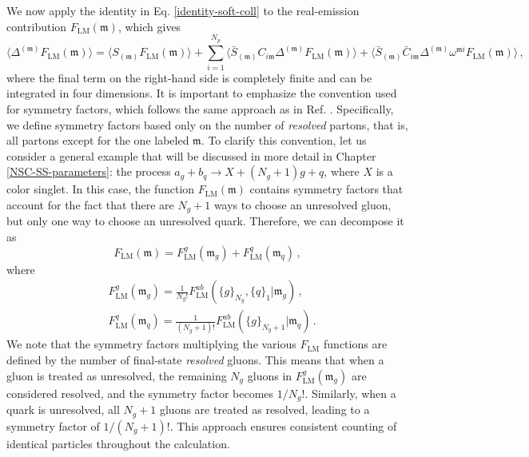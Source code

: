 \documentclass[a4paper, 12pt]{book}
\newcommand{\um}{\mathfrak{m}}
\begin{document}
We now apply the identity in Eq. \ref{identity-soft-coll} to the real-emission contribution $F_{\mathrm{LM}}(\um)$, which gives
\begin{equation}
  \langle \Delta^{(\um)}F_{\mathrm{LM}}(\um) \rangle = \langle S_{(\um)}F_{\mathrm{LM}}(\um) \rangle + \sum_{i=1}^{N_p} \langle \bar{S}_{(\um)}C_{i\um} \Delta^{(\um)} F_{\mathrm{LM}}(\um) \rangle + \langle \bar{S}_{(\um)} \bar{C}_{i\um} \Delta^{(\um)} \omega^{\um i} F_{\mathrm{LM}}(\um) \rangle \, ,
  \label{identity-flm}
\end{equation}
where the final term on the right-hand side is completely finite and can be integrated in four dimensions. It is important to emphasize the convention used for symmetry factors, which follows the same approach as in Ref. \cite{Devoto:2025kin}. Specifically, we define symmetry factors based only on the number  of \emph{resolved} partons, that is, all partons except for the one labeled $\um$.  To clarify this convention, let us consider a general example that will be discussed in more detail in Chapter \ref{NSC-SS-parameters}: the process $a_g + b_q \to X + (N_g+1)g + q$, where $X$ is a color singlet. In this case, the function $F_{\mathrm{LM}}(\um)$ contains symmetry  factors that account for the fact that there are $N_g+1$ ways to choose an unresolved gluon, but 
only one way to choose an unresolved quark. Therefore, we can decompose it as
\begin{equation}
  F_{\mathrm{LM}}(\um) = F_{\mathrm{LM}}^g(\um_g) +F_{\mathrm{LM}}^q(\um_q) \, ,
\end{equation}
where
\begin{equation}
  \begin{aligned}
    & F_{\mathrm{LM}}^g(\um_g) = \frac{1}{N_g!}  F_{\mathrm{LM}}^{ab} \left(\{g\}_{N_g}, \{q\}_1 | \um_g \right) \, , \\
    & F_{\mathrm{LM}}^q(\um_q) = \frac{1}{(N_g+1)!}  F_{\mathrm{LM}}^{ab} \left(\{g\}_{N_g+1}| \um_q \right) \, .
  \end{aligned}
\end{equation}
We note that the symmetry factors multiplying the various $F_{\mathrm{LM}}$ functions are defined by the number of final-state \emph{resolved} gluons. This means that when a gluon is treated as unresolved, the remaining $N_g$ gluons in $F_{\mathrm{LM}}^g(\um_g)$ are considered resolved, and the symmetry factor becomes $1/N_g!$. Similarly, when a quark is unresolved, all $N_g+1$ 
gluons are treated as resolved, leading to a symmetry factor of $1/(N_g+1)!$. This approach ensures consistent counting of identical particles throughout the calculation.
\end{document}
